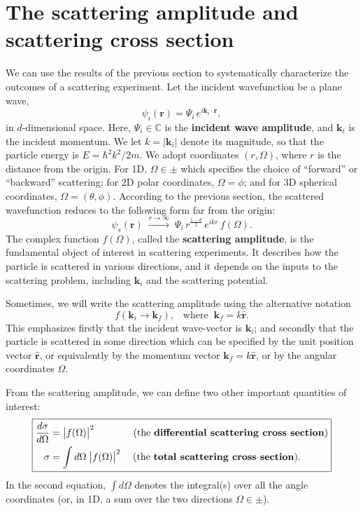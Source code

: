 \documentclass[pra,12pt]{revtex4}
\begin{document}
\section{The scattering amplitude and scattering cross section}
\label{sec:scattering_amplitude}

We can use the results of the previous section to systematically
characterize the outcomes of a scattering experiment.  Let the
incident wavefunction be a plane wave,
$$\psi_i(\mathbf{r}) = \Psi_i \, e^{i\mathbf{k}_i\cdot\mathbf{r}},$$
in $d$-dimensional space.  Here, $\Psi_i \in \mathbb{C}$ is the
\textbf{incident wave amplitude}, and $\mathbf{k}_i$ is the incident
momentum.  We let $k = |\mathbf{k}_i|$ denote its magnitude, so that
the particle energy is $E = \hbar^2k^2/2m$.  We adopt coordinates
$(r,\Omega)$, where $r$ is the distance from the origin.  For 1D,
$\Omega \in \pm$ which specifies the choice of ``forward'' or
``backward'' scattering; for 2D polar coordinates, $\Omega = \phi$;
and for 3D spherical coordinates, $\Omega = (\theta,\phi)$.  According
to the previous section, the scattered wavefunction reduces to the
following form far from the origin:
$$\psi_s(\mathbf{r})\;  \overset{r\rightarrow\infty}{\longrightarrow}\; \Psi_i \, r^{\frac{1-d}{2}} \, e^{ikr} \, f(\Omega).$$
The complex function $f(\Omega)$, called the \textbf{scattering
  amplitude}, is the fundamental object of interest in scattering
experiments.  It describes how the particle is scattered in various
directions, and it depends on the inputs to the scattering problem,
including $\mathbf{k}_i$ and the scattering potential.

Sometimes, we will write the scattering amplitude using the
alternative notation
$$f(\mathbf{k}_i \rightarrow \mathbf{k}_f), \;\;\;\mathrm{where}\;\; \mathbf{k}_f = k \hat{\mathbf{r}}.$$
This emphasizes firstly that the incident wave-vector is
$\mathbf{k}_i$; and secondly that the particle is scattered in some
direction which can be specified by the unit position vector
$\hat{\mathbf{r}}$, or equivalently by the momentum vector
$\mathbf{k}_f = k \hat{\mathbf{r}}$, or by the angular coordinates
$\Omega$.

From the scattering amplitude, we can define two other important
quantities of interest:
$$\boxed{\begin{aligned}\frac{d\sigma}{d\Omega} &= \big|f(\Omega)\big|^2 \qquad\quad\quad \text{(the \textbf{differential scattering cross section})} \\ \sigma &= \int d\Omega\; \big|f(\Omega)\big|^2 \quad\; \text{(the \textbf{total scattering cross section}).}
  \end{aligned}}$$
In the second equation, $\int d\Omega$ denotes the integral(s) over
all the angle coordinates (or, in 1D, a sum over the two directions
$\Omega \in \pm$).
\end{document}
